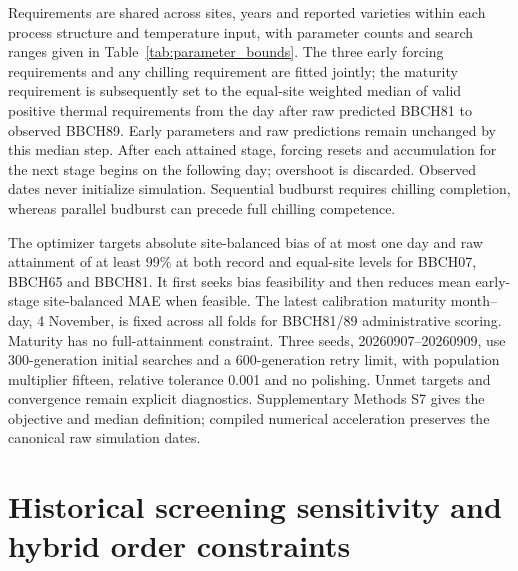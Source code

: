 \documentclass[a4paper,11pt]{article}
\let\OriginalSection\section
\renewcommand{\section}{\FloatBarrier\OriginalSection}
\begin{document}
\begin{table}[!htbp]
\centering
\caption{Adjustable parameter counts and inclusive numerical search ranges.
Every structure has four stage-specific forcing requirements; chilling models
add one common chilling requirement. Linear forcing accumulates degree-days
above 0~$^{\circ}$C; beta forcing and both chilling responses accumulate daily
response units. Ranges apply separately to each forcing requirement and do
not represent physiological limits.}
\label{tab:parameter_bounds}
\small

\end{table}

Requirements are shared across sites, years and reported varieties within each process structure and temperature input, with parameter counts and search ranges given in Table~\ref{tab:parameter_bounds}. The three early forcing requirements and any chilling requirement are fitted jointly; the maturity requirement is subsequently set to the equal-site weighted median of valid positive thermal requirements from the day after raw predicted BBCH81 to observed BBCH89. Early parameters and raw predictions remain unchanged by this median step. After each attained stage, forcing resets and accumulation for the next stage begins on the following day; overshoot is discarded. Observed dates never initialize simulation. Sequential budburst requires chilling completion, whereas parallel budburst can precede full chilling competence.

The optimizer targets absolute site-balanced bias of at most one day and raw attainment of at least 99\% at both record and equal-site levels for BBCH07, BBCH65 and BBCH81. It first seeks bias feasibility and then reduces mean early-stage site-balanced MAE when feasible. The latest calibration maturity month--day, 4 November, is fixed across all folds for BBCH81/89 administrative scoring. Maturity has no full-attainment constraint. Three seeds, 20260907--20260909, use 300-generation initial searches and a 600-generation retry limit, with population multiplier fifteen, relative tolerance 0.001 and no polishing. Unmet targets and convergence remain explicit diagnostics. Supplementary Methods S7 gives the objective and median definition; compiled numerical acceleration preserves the canonical raw simulation dates.

\section{Historical screening sensitivity and hybrid order constraints}
\end{document}
